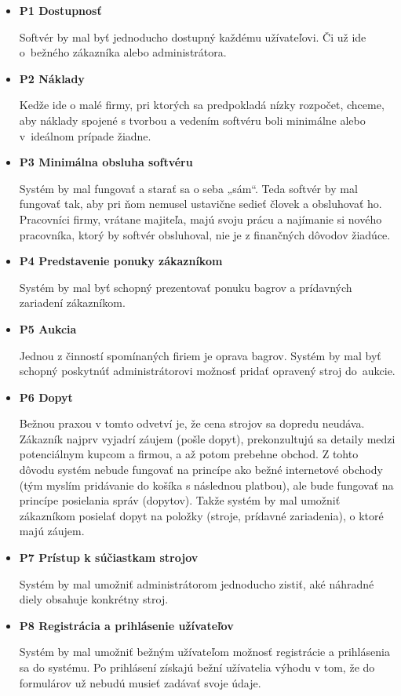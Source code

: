 \begin{itemize}
\item \textbf{P1 Dostupnosť}

Softvér by mal byť jednoducho dostupný každému užívateľovi. Či už ide o~bežného zákazníka alebo administrátora.

\item \textbf{P2 Náklady}

Kedže ide o malé firmy, pri ktorých sa predpokladá nízky rozpočet, chceme, aby náklady spojené s tvorbou a vedením softvéru boli minimálne alebo v~ideálnom prípade žiadne.

\item \textbf{P3 Minimálna obsluha softvéru}

Systém by mal fungovať a starať sa o seba „sám“. Teda softvér by mal fungovať tak, aby pri ňom nemusel ustavične sedieť človek a obsluhovať ho. Pracovníci firmy, vrátane majiteľa, majú svoju prácu a najímanie si nového pracovníka, ktorý by softvér obsluhoval, nie je z finančných dôvodov žiadúce.

\item \textbf{P4 Predstavenie ponuky zákazníkom}

Systém by mal byť schopný prezentovať ponuku bagrov a prídavných za\-ria\-de\-ní zákazníkom.

\item \textbf{P5 Aukcia}

Jednou z činností spomínaných firiem je oprava bagrov. Systém by mal byť schopný poskytnúť administrátorovi možnosť pridať opravený stroj do~au\-kci\-e.

\item \textbf{P6 Dopyt}

Bežnou praxou v tomto odvetví je, že cena strojov sa dopredu neudáva. Zákazník najprv vyjadrí záujem (pošle dopyt), prekonzultujú sa detaily medzi potenciálnym kupcom a firmou, a až potom prebehne obchod. Z tohto dôvodu systém nebude fungovať na princípe ako bežné internetové obchody (tým myslím pridávanie do košíka s následnou platbou), ale bude fungovať na princípe posielania správ (dopytov). Takže systém by mal umožniť zákazníkom posielať dopyt na položky (stroje, prídavné zariadenia), o ktoré majú záujem.

\item \textbf{P7 Prístup k súčiastkam strojov}

Systém by mal umožniť administrátorom jednoducho zistiť, aké náhradné diely obsahuje konkrétny stroj. 

\item \textbf{P8 Registrácia a prihlásenie užívateľov}

Systém by mal umožniť bežným užívateľom možnosť registrácie a pri\-hlá\-se\-nia sa do systému. Po prihlásení získajú bežní užívatelia výhodu v tom, že do formulárov už nebudú musieť zadávať svoje údaje.
\end{itemize}

